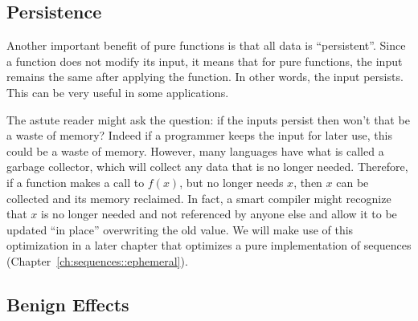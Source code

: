 \subsection{Persistence}
\label{sec:language::functional-algorithms::persistence}

\begin{cluster}
\label{grp:grm:language::functional-algorithms::benefit}

\begin{gram}
\label{grm:language::functional-algorithms::benefit}
Another important benefit of pure functions is that all data is
``persistent''.   Since a function does not modify its input, it means
that for pure functions, the input remains the same after applying the
function.   In other words, the input persists.     This can be very
useful in some applications.

\end{gram}
\end{cluster}

\begin{cluster}
\label{grp:rmrk:language::functional-algorithms::astute}

\begin{remark}
\label{rmrk:language::functional-algorithms::astute}
  The astute reader might ask the question: if the inputs persist then won't that
  be a waste of memory?  Indeed if a programmer keeps the input for later use, this
  could be a waste of memory.  However, many languages
  have what is called a garbage collector, which will collect any data
  that is no longer needed.  Therefore, if a function makes a call to
  $f(x)$, but no longer needs $x$, then $x$
  can be collected and its memory reclaimed.   In fact, a smart
  compiler might recognize that
  $x$ is no longer needed and not referenced by anyone else and allow it to be updated ``in place''
  overwriting the old value.    We will make use of this optimization
  in a later chapter that optimizes a pure implementation of sequences (Chapter~\ref{ch:sequences::ephemeral}).

\end{remark}
\end{cluster}


\subsection{Benign Effects}
\label{sec:language::functional-algorithms::benign-effects}

